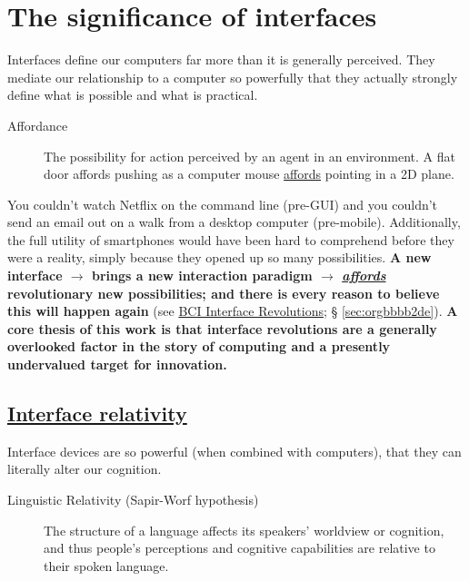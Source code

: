 \documentclass[logo,bsc,singlespacing,parskip]{infthesis}
\begin{document}
\section{The significance of interfaces}
\label{sec:orgb51491d}
Interfaces define our computers far more than it is generally perceived.
They mediate our relationship to a computer so powerfully that they actually strongly define what is possible and what is practical.

\begin{mdframed}
\begin{description}
\item[{\label{org12d3542}Affordance}] The possibility for action perceived by an agent in an environment. A flat door \label{orga95a77e}affords pushing as a computer mouse \hyperref[orga95a77e]{affords} pointing in a 2D plane.
\end{description}
\end{mdframed}

You couldn't watch Netflix on the command line (pre-GUI) and you couldn't send an email out on a walk from a desktop computer (pre-mobile).
Additionally, the full utility of smartphones would have been hard to comprehend before they were a reality, simply because they opened up so many possibilities.
\textbf{A new interface \(\rightarrow\) brings a new interaction paradigm \(\rightarrow\) \emph{\hyperref[orga95a77e]{affords}} revolutionary new possibilities; and there is every reason to believe this will happen again} (see \hyperref[sec:orgbbbb2de]{BCI Interface Revolutions}; § \ref{sec:orgbbbb2de}).
\textbf{A core thesis of this work is that interface revolutions are a generally overlooked factor in the story of computing and a presently undervalued target for innovation.}
\subsection{\hyperref[orga30ac29]{Interface relativity}}
\label{sec:org27af83d}
Interface devices are so powerful (when combined with computers), that they can literally alter our cognition.

\begin{mdframed}
\begin{description}
\item[{Linguistic Relativity (Sapir-Worf hypothesis)}] The structure of a language affects its speakers' worldview or cognition, and thus people's perceptions and cognitive capabilities are relative to their spoken language.
\end{description}
\end{mdframed}
\end{document}

